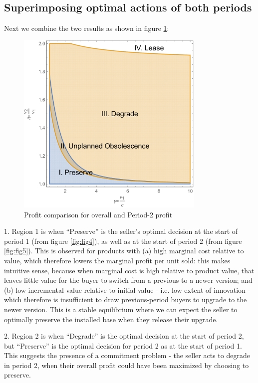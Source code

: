 \documentclass[isre,blindrev]{informs3} %
\begin{document}
\subsection{Superimposing optimal actions of both periods}
\label{innovate-superimpose}

Next we combine the two results as shown in figure \ref{fig:fig6}:

\begin{figure}[htp]
    \centering
    \includegraphics[width=9cm]{2020_05_19-overleaf-mirror_gr6.pdf}
    \caption{Profit comparison for overall and Period-2 profit}
    \label{fig:fig6}
\end{figure}

1. Region 1 is when {``}Preserve{''} is the seller{'}s optimal decision at the start of period 1 (from figure \ref{fig:fig4}), as well as at the start of
period 2 (from figure \ref{fig:fig5}). This is observed for products with (a) high marginal cost relative to value, which therefore lowers the marginal profit
per unit sold: this makes intuitive sense, because when marginal cost is high relative to product value, that leaves little value for the buyer to
switch from a previous to a newer version; and (b) low incremental value relative to initial value - i.e. low extent of innovation - which therefore
is insufficient to draw previous-period buyers to upgrade to the newer version. This is a stable equilibrium where we can expect the seller to optimally preserve the installed base when they release their upgrade.

2. Region 2 is when {``}Degrade{''} is the optimal decision at the start of period 2, but {``}Preserve{''} is the optimal decision for period 2 as at the start of period 1.
This suggests the presence of a commitment problem - the seller acts to degrade in period 2, when their overall profit could have been maximized by choosing to preserve.
\end{document}
